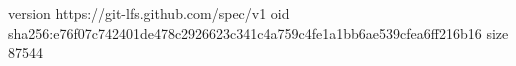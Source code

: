 version https://git-lfs.github.com/spec/v1
oid sha256:e76f07c742401de478c2926623c341c4a759c4fe1a1bb6ae539cfea6ff216b16
size 87544
